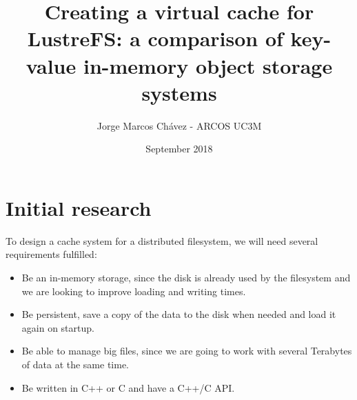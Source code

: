 \documentclass[12pt]{article}
\title{Creating a virtual cache for LustreFS: a comparison of key-value in-memory object storage systems}
\author{Jorge Marcos Chávez - ARCOS UC3M}
\date{September 2018}
\begin{document}
\maketitle
\thispagestyle{empty}

\tableofcontents
\newpage

\section{Initial research}

To design a cache system for a distributed filesystem, we will need several requirements fulfilled:
\begin{itemize}
    \item Be an in-memory storage, since the disk is already used by the filesystem and we are looking to improve loading and writing times.
    \item Be persistent, save a copy of the data to the disk when needed and load it again on startup.
    \item Be able to manage big files, since we are going to work with several Terabytes of data at the same time.
    \item Be written in C++ or C and have a C++/C API.
\end{itemize}
\end{document}
